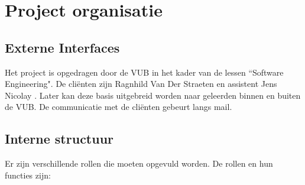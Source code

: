 \section{Project organisatie}

\subsection{Externe Interfaces}
Het project is opgedragen door de VUB in het kader van de lessen ``Software Engineering". De cliënten zijn Ragnhild Van Der Straeten \cite{rvdstrae} en assistent Jens Nicolay \cite{jnicolay}. Later kan deze basis uitgebreid worden naar geleerden binnen en buiten de VUB. 
De communicatie met de cliënten gebeurt langs mail.


\subsection{Interne structuur}
Er zijn verschillende rollen die moeten opgevuld worden.
De rollen en hun functies zijn: 

